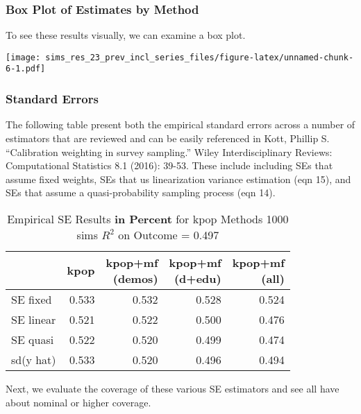 \documentclass[
]{article}
\begin{document}
\hypertarget{box-plot-of-estimates-by-method}{%
\subsubsection{Box Plot of Estimates by
Method}\label{box-plot-of-estimates-by-method}}

To see these results visually, we can examine a box plot.

\texttt{[image: sims\_res\_23\_prev\_incl\_series\_files/figure-latex/unnamed-chunk-6-1.pdf]}

\hypertarget{standard-errors}{%
\subsubsection{\texorpdfstring{Standard Errors
\label{sims:SEs}}{Standard Errors }}\label{standard-errors}}

The following table present both the empirical standard errors across a
number of estimators that are reviewed and can be easily referenced in
Kott, Phillip S. ``Calibration weighting in survey sampling.'' Wiley
Interdisciplinary Reviews: Computational Statistics 8.1 (2016): 39-53.
These include including SEs that assume fixed weights, SEs that us
linearization variance estimation (eqn 15), and SEs that assume a
quasi-probability sampling process (eqn 14).

\begin{table}[!h]

\caption{\label{tab:SEs}Empirical SE Results \textbf{in Percent} for kpop Methods 1000 sims $R^2$ on Outcome =  0.497}
\centering
\begin{tabular}[t]{lrrrr}
\toprule
  & kpop & \makecell[c]{kpop+mf\\(demos)} & \makecell[r]{kpop+mf\\(d+edu)} & \makecell[l]{kpop+mf\\(all)}\\
\midrule
SE fixed & 0.533 & 0.532 & 0.528 & 0.524\\
SE linear & 0.521 & 0.522 & 0.500 & 0.476\\
SE quasi & 0.522 & 0.520 & 0.499 & 0.474\\
sd(y hat) & 0.533 & 0.520 & 0.496 & 0.494\\
\bottomrule
\end{tabular}
\end{table}

Next, we evaluate the coverage of these various SE estimators and see
all have about nominal or higher coverage.
\end{document}
